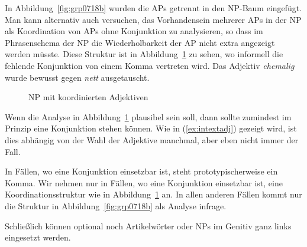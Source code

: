 In Abbildung~\ref{fig:grp0718b} wurden die APs getrennt in den NP-Baum eingefügt.
Man kann alternativ auch versuchen, das Vorhandensein mehrerer APs in der NP als Koordination von APs ohne Konjunktion zu analysieren, so dass im Phrasenschema der NP die Wiederholbarkeit der AP nicht extra angezeigt werden müsste.
Diese Struktur ist in Abbildung~\ref{fig:ngradjkonj} zu sehen, wo informell die fehlende Konjunktion von einem Komma vertreten wird.
Das Adjektiv \textit{ehemalig} wurde bewusst gegen \textit{nett} ausgetauscht.

\begin{figure}
  \centering
  \caption{NP mit koordinierten Adjektiven}
  \label{fig:ngradjkonj}
\end{figure}

Wenn die Analyse in Abbildung~\ref{fig:ngradjkonj} plausibel sein soll, dann sollte zumindest im Prinzip eine Konjunktion stehen können.
Wie in (\ref{ex:intextadj}) gezeigt wird, ist dies abhängig von der Wahl der Adjektive manchmal, aber eben nicht immer der Fall.

\begin{exe}
  \ex\label{ex:intextadj}
  \begin{xlist}
  \end{xlist}
\end{exe}

In Fällen, wo eine Konjunktion einsetzbar ist, steht prototypischerweise ein Komma.
Wir nehmen nur in Fällen, wo eine Konjunktion einsetzbar ist, eine Koordinationsstruktur wie in Abbildung~\ref{fig:ngradjkonj} an.
In allen anderen Fällen kommt nur die Struktur in Abbildung~\ref{fig:grp0718b} als Analyse infrage.

Schließlich können optional noch Artikelwörter oder NPs im Genitiv ganz links eingesetzt werden.

\begin{exe}
  \ex\label{ex:grp7000}
  \begin{xlist}
  \end{xlist}
\end{exe}


